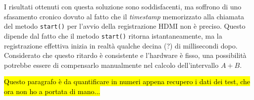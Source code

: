 I risultati ottenuti con questa soluzione sono soddisfacenti, ma soffrono di uno sfasamento cronico dovuto al fatto che il \emph{timestamp} memorizzato alla chiamata del metodo \texttt{start()} per l'avvio della registrazione HDMI non è preciso. Questo dipende dal fatto che il metodo \texttt{start()} ritorna istantaneamente, ma la registrazione effettiva inizia in realtà qualche decina (?) di millisecondi dopo. Considerato che questo ritardo è consistente e l'hardware è fisso, una possibilità potrebbe essere di compensarlo manualmente nel calcolo dell'intervallo $A+B$.

\hl{Questo paragrafo è da quantificare in numeri appena recupero i dati dei test, che ora non ho a portata di mano...}

